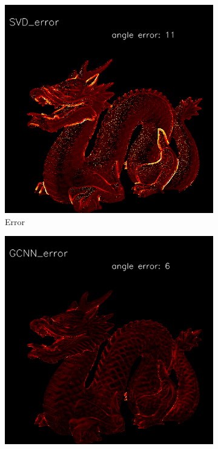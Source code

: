 \begin{figure}[h!]
	\begin{subfigure}[b]{0.3\linewidth}
		\includegraphics[width=\linewidth]{./Figures/comparison/fancy_eval_3_error_SVD.png}
		\caption{Error}
	\end{subfigure}
	\begin{subfigure}[b]{0.3\linewidth}
		\includegraphics[width=\linewidth]{./Figures/comparison/fancy_eval_3_error_GCNN.png}

\end{subfigure}
\end{figure}
